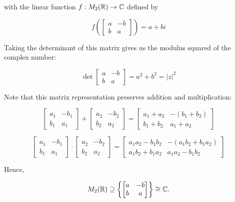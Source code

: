 with the linear function \( f: M_2(\mathbb{R}) \to \mathbb{C} \) defined by

\[
	f \left(
		\begin{bmatrix}
		a & -b \\
		b & a
	\end{bmatrix}
	\right)
	= a + bi
\]

Taking the determinant of this matrix gives us the modulus squared of the complex number:

\[
	\det\begin{bmatrix}
		a & -b \\
		b & a
	\end{bmatrix} = a^2 + b^2 = |z|^2
\]

Note that this matrix representation preserves addition and multiplication:

\[
	\begin{bmatrix}
		a_1 & -b_1 \\
		b_1 & a_1
	\end{bmatrix} + \begin{bmatrix}
		a_2 & -b_2 \\
		b_2 & a_2
	\end{bmatrix} = 
	\begin{bmatrix}
		a_1 + a_2 & -(b_1 + b_2) \\
		b_1 + b_2 & a_1 + a_2
	\end{bmatrix}
\]

\[
	\begin{bmatrix}
		a_1 & -b_1 \\
		b_1 & a_1
	\end{bmatrix} \cdot \begin{bmatrix}
		a_2 & -b_2 \\
		b_2 & a_2
	\end{bmatrix} = 
	\begin{bmatrix}
		a_1 a_2 - b_1 b_2 & -(a_1 b_2 + b_1 a_2) \\
		a_1 b_2 + b_1 a_2 & a_1 a_2 - b_1 b_2
	\end{bmatrix}
\]

Hence, 

\[
	M_2(\mathbb{R}) \supseteq
	\left\{
		\begin{bmatrix}
			a & -b \\ 
			b & a
		\end{bmatrix}
	\right\}
	\cong \mathbb{C}.
\]